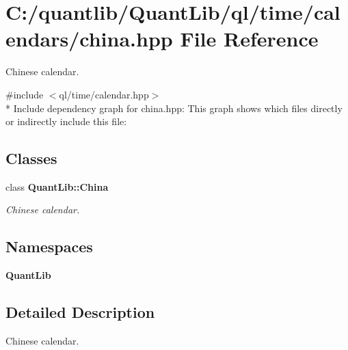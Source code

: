 \section{C\+:/quantlib/\+Quant\+Lib/ql/time/calendars/china.hpp File Reference}
\label{china_8hpp}


Chinese calendar.  


{\ttfamily \#include $<$ql/time/calendar.\+hpp$>$}\\*
Include dependency graph for china.\+hpp\+:
This graph shows which files directly or indirectly include this file\+:
\subsection*{Classes}
\begin{DoxyCompactItemize}
\item 
class {\bf Quant\+Lib\+::\+China}
\begin{DoxyCompactList}\small\item\em Chinese calendar. \end{DoxyCompactList}\end{DoxyCompactItemize}
\subsection*{Namespaces}
\begin{DoxyCompactItemize}
\item 
 {\bf Quant\+Lib}
\end{DoxyCompactItemize}


\subsection{Detailed Description}
Chinese calendar. 

